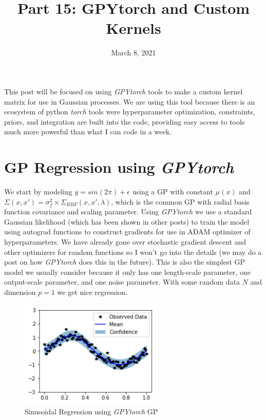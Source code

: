 \documentclass[12pt]{article}
\title{Part 15: GPYtorch and Custom Kernels}
\begin{document}
\date{March 8, 2021}
\maketitle

This post will be focused on using \emph{GPYtorch} tools to make a custom kernel matrix for use in Gaussian processes. We are using this tool because there is an ecosystem of python \emph{torch} tools were hyperparameter optimization, constraints, priors, and integration are built into the code, providing easy access to tools much more powerful than what I can code in a week.

\section{GP Regression using \emph{GPYtorch}}

We start by modeling $y=sin(2\pi) + \epsilon$ using a GP with constant $\mu(x)$ and $\Sigma(x,x')=\sigma_f^2 \times \Sigma_{RBF}(x,x',\lambda)$, which is the common GP with radial basis function covariance and scaling parameter.  Using \emph{GPYtorch} we use a standard Gaussian likelihood (which has been shown in other posts) to train the model using autograd functions to construct gradients for use in ADAM optimizer of hyperparameters. We have already gone over stochastic gradient descent and other optimizers for random functions so I won't go into the details (we may do a post on how \emph{GPYtorch} does this in the future). This is also the simplest GP model we usually consider because it only has one length-scale parameter, one output-scale parameter, and one noise parameter. With some random data $N$ and dimension $p=1$ we get nice regression.

\begin{figure}[h]
\centering
\includegraphics[width=0.6\textwidth]{Post_15_regulargp}
\caption{Sinusoidal Regression using \emph{GPYtorch} GP}
\end{figure}
\end{document}
